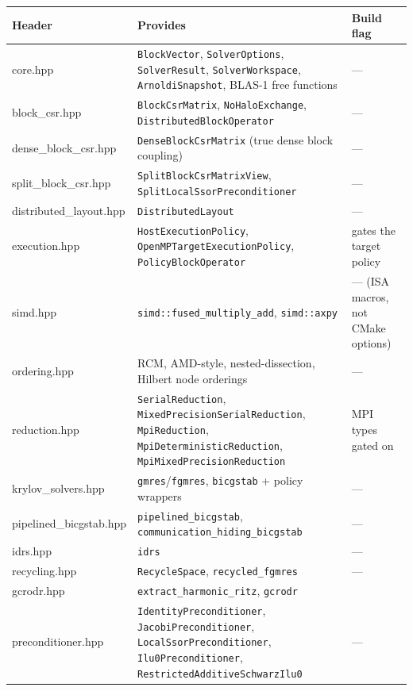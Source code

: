 \documentclass[11pt,a4paper]{report}
\begin{document}
\begin{longtable}{L{0.20\textwidth}P{0.42\textwidth}P{0.28\textwidth}}
\toprule
Header & Provides & Build flag \\
\midrule
\endhead
core.hpp & \lstinline!BlockVector!, \lstinline!SolverOptions!, \lstinline!SolverResult!, \lstinline!SolverWorkspace!, \lstinline!ArnoldiSnapshot!, BLAS-1 free functions & --- \\
block\_csr.hpp & \lstinline!BlockCsrMatrix!, \lstinline!NoHaloExchange!, \lstinline!DistributedBlockOperator! & --- \\
dense\_block\_csr.hpp & \lstinline!DenseBlockCsrMatrix! (true dense block coupling) & --- \\
split\_block\_csr.hpp & \lstinline!SplitBlockCsrMatrixView!, \lstinline!SplitLocalSsorPreconditioner! & --- \\
distributed\_layout.hpp & \lstinline!DistributedLayout! & --- \\
execution.hpp & \lstinline!HostExecutionPolicy!, \lstinline!OpenMPTargetExecutionPolicy!, \lstinline!PolicyBlockOperator! &  gates the target policy \\
simd.hpp & \lstinline!simd::fused_multiply_add!, \lstinline!simd::axpy! & --- (ISA macros, not CMake options) \\
ordering.hpp & RCM, AMD-style, nested-dissection, Hilbert node orderings & --- \\
reduction.hpp & \lstinline!SerialReduction!, \lstinline!MixedPrecisionSerialReduction!, \lstinline!MpiReduction!, \lstinline!MpiDeterministicReduction!, \lstinline!MpiMixedPrecisionReduction! & MPI types gated on  \\
krylov\_solvers.hpp & \lstinline!gmres!/\lstinline!fgmres!, \lstinline!bicgstab! + policy wrappers & --- \\
pipelined\_bicgstab.hpp & \lstinline!pipelined_bicgstab!, \lstinline!communication_hiding_bicgstab! & --- \\
idrs.hpp & \lstinline!idrs! & --- \\
recycling.hpp & \lstinline!RecycleSpace!, \lstinline!recycled_fgmres! & --- \\
gcrodr.hpp & \lstinline!extract_harmonic_ritz!, \lstinline!gcrodr! &  \\
preconditioner.hpp & \lstinline!IdentityPreconditioner!, \lstinline!JacobiPreconditioner!, \lstinline!LocalSsorPreconditioner!, \lstinline!Ilu0Preconditioner!, \lstinline!RestrictedAdditiveSchwarzIlu0! & --- \\

\end{longtable}
\end{document}
